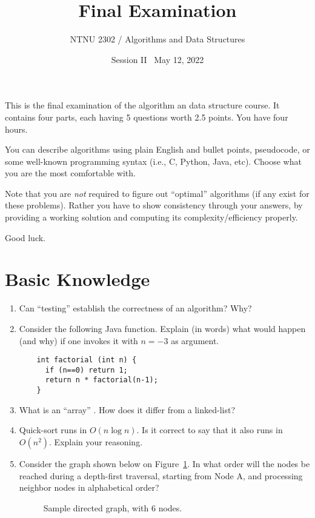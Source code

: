 \documentclass{article}
\title{Final Examination}
\author{NTNU 2302 / Algorithms and Data Structures}
\date{Session II \textbullet\ May 12, 2022}
\begin{document}
\maketitle


This is the final examination of the algorithm an data structure
course. It contains four parts, each having 5 questions worth 2.5
points. You have four hours.

You can describe algorithms using plain English and bullet points,
pseudocode, or some well-known programming syntax (i.e., C,
Python, Java, etc). Choose what you are the most comfortable with.

Note that you are \emph{not} required to figure out ``optimal''
algorithms (if any exist for these problems). Rather you have to show
consistency through your answers, by providing a working solution and
computing its complexity/efficiency properly.

Good luck.

\section{Basic Knowledge}

\begin{enumerate}
\item Can ``testing'' establish the correctness of an algorithm? Why?
\item Consider the following Java function. Explain (in words) what
  would happen (and why) if one invokes it with $n=-3$ as argument.
  \begin{verbatim}
    int factorial (int n) {
      if (n==0) return 1;
      return n * factorial(n-1);
    }
  \end{verbatim}
\item What is an ``array'' . How does it differ from a linked-list?
\item Quick-sort runs in $O(n \log n)$. Is it correct to say that it
  also runs in $O(n^2)$. Explain your reasoning.
\item Consider the graph shown below on Figure~\ref{fig:graph}. In
  what order will the nodes be reached during a depth-first
  traversal, starting from Node A, and processing neighbor nodes
  in alphabetical order?
  \begin{figure}[htbp]
  \begin{center}
    
  \end{center}
  \caption{Sample directed graph, with 6 nodes.}
  \label{fig:graph}
\end{figure}
\end{enumerate}
\end{document}
